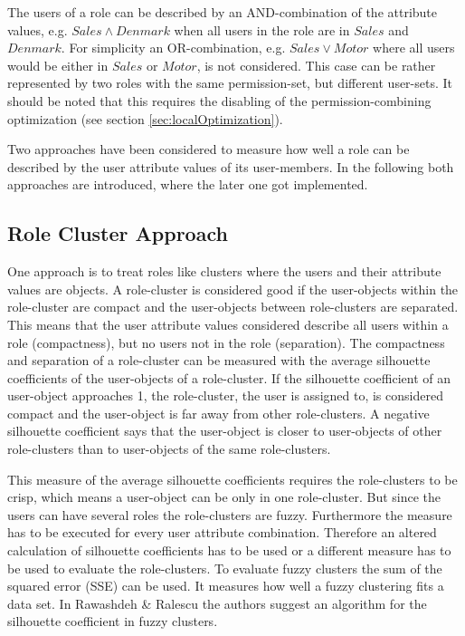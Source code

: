     The users of a role can be described by an AND-combination of the attribute values, e.g. $Sales \wedge Denmark$ when all users in the role are in $Sales$ and $Denmark$. For simplicity an OR-combination, e.g. $Sales \vee Motor$ where all users would be either in $Sales$ or $Motor$, is not considered. This case can be rather represented by two roles with the same permission-set, but different user-sets. It should be noted that this requires the disabling of the permission-combining optimization (see section \ref{sec:localOptimization}).
    
    \iffalse
    A similar approach is followed in Xu \& Stoller\cite{Xu}, but they calculate an attribute mismatch of roles, which does not consider the heterogeneity of users in different roles as well as homogeneity of users in the same role. In the following sections two approaches are discussed theoretically and one of the approaches is implemented.
    
    \fi
    Two approaches have been considered to measure how well a role can be described by the user attribute values of its user-members. In the following both approaches are introduced, where the later one got implemented.
    
        \subsection{Role Cluster Approach}
        One approach is to treat roles like clusters where the users and their attribute values are objects. A role-cluster is considered good if the user-objects within the role-cluster are compact and the user-objects between role-clusters are separated. This means that the user attribute values considered describe all users within a role (compactness), but no users not in the role (separation). The compactness and separation of a role-cluster can be measured with the average silhouette coefficients of the user-objects of a role-cluster\cite{Han}. If the silhouette coefficient of an user-object approaches 1, the role-cluster, the user is assigned to, is considered compact and the user-object is far away from other role-clusters. A negative silhouette coefficient says that the user-object is closer to user-objects of other role-clusters than to user-objects of the same role-clusters.
        
        This measure of the average silhouette coefficients requires the role-clusters to be crisp, which means a user-object can be only in one role-cluster. But since the users can have several roles the role-clusters are fuzzy. Furthermore the measure has to be executed for every user attribute combination. Therefore an altered calculation of silhouette coefficients has to be used or a different measure has to be used to evaluate the role-clusters. To evaluate fuzzy clusters the sum of the squared error (SSE) can be used\cite{Han}. It measures how well a fuzzy clustering fits a data set. In Rawashdeh \& Ralescu\cite{rawashdeh2012fuzzy} the authors suggest an algorithm for the silhouette coefficient in fuzzy clusters.
        

